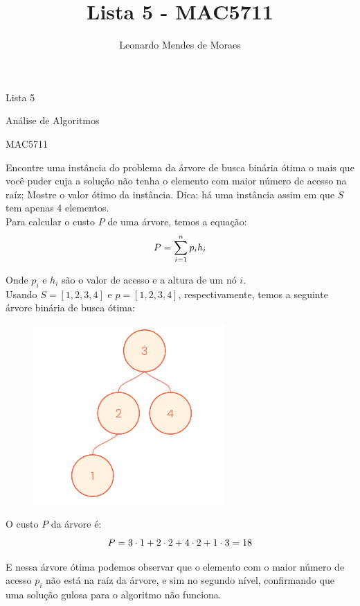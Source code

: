 \documentclass[12pt,a4paper]{article}
\author{Leonardo Mendes de Moraes }
\title{Lista 5 - MAC5711}
\date{}
\begin{document}
	\begin{center}
    {\huge Lista 5 \par} {\LARGE Análise de Algoritmos \par} {\Large MAC5711
    \par}
	\end{center}

 Encontre uma instância do problema da árvore de busca binária ótima
o mais que você puder cuja a solução não tenha o elemento com maior número de
acesso na raíz; Mostre o valor ótimo da instância. Dica: há uma instância assim
em que $S$ tem apenas 4 elementos. \\

Para calcular o custo $P$ de uma árvore, temos a equação:
\begin{equation}
    P = \sum^{n}_{i=1} p_{i} h_{i}\\
    \notag
\end{equation}

Onde $p_{i}$ e $h_{i}$ são o valor de acesso e a altura de um nó $i$. \\
Usando $S = [1, 2, 3, 4]$ e $p= [1, 2, 3, 4]$, respectivamente, temos a seguinte
árvore binária de busca ótima:
\begin{figure}[H]
    \centering
    \includegraphics[scale=0.6]{true_optima.png}
\end{figure}

O custo $P$ da árvore é:
\begin{equation}
    P = 3 \cdot 1 + 2 \cdot 2 + 4 \cdot 2 + 1 \cdot 3 = 18
    \notag
\end{equation}

E nessa árvore ótima podemos observar que o elemento com o maior número de
acesso $p_{i}$ não está na raíz da árvore, e sim no segundo nível, confirmando
que uma solução gulosa para o algoritmo não funciona.
\end{document}
